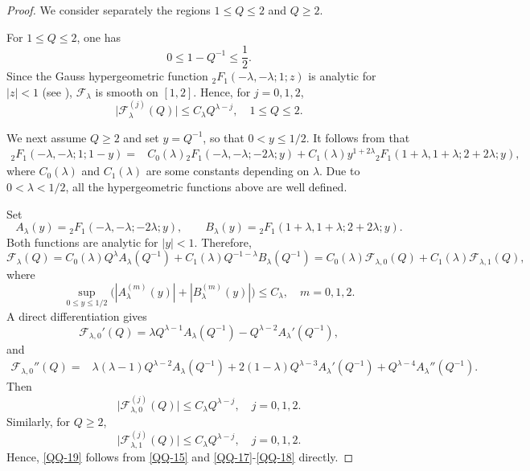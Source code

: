 \documentclass[11pt,twoside]{article}
\newcommand{\f}{\frac}
\theoremstyle{plain}
\theoremstyle{definition}
\theoremstyle{remark}
\numberwithin{equation}{section}
\begin{document}
\begin{proof}
We consider separately the regions $1\leq Q\leq2$ and $Q\geq2$.

For $1\leq Q\leq2$, one has
\[
0\leq1-Q^{-1}\leq\f12.
\]
Since the Gauss hypergeometric function ${}_2F_1(-\lambda,-\lambda;1;z)$ is analytic for $|z|<1$ (see \cite[Section~15.2]{OLBC}),
$\mathcal F_\lambda$ is smooth on $[1,2]$. Hence, for $j=0,1,2$,
\begin{equation}\label{QQ-15}
\big|
\mathcal F_\lambda^{(j)}(Q)
\big|
\leq
C_\lambda Q^{\lambda-j},
\quad 1\leq Q\leq2.
\end{equation}

We next assume $Q\geq2$ and set $y=Q^{-1}$, so that
$0<y\leq1/2$. It follows from
\cite[Section ~15.8]{OLBC} that
\[
\begin{aligned}
{}_2F_1(-\lambda,-\lambda;1;1-y)
={}&
C_{0}(\lambda)
{}_2F_1(-\lambda,-\lambda;-2\lambda;y)+
C_{1}(\lambda)
y^{1+2\lambda}
{}_2F_1(1+\lambda,1+\lambda;2+2\lambda;y),
\end{aligned}
\]
where $C_0(\lambda)$ and $C_1(\lambda)$ are some constants depending
on $\lambda$.
Due to $0<\lambda<1/2$, all the hypergeometric functions
above are well defined.

Set
\[
A_\lambda(y)={}_2F_1(-\lambda,-\lambda;-2\lambda;y),
\qquad
B_\lambda(y)={}_2F_1(1+\lambda,1+\lambda;2+2\lambda;y).
\]
Both functions are analytic for $|y|<1$. Therefore,
\begin{equation}\label{QQ-16}
\mathcal F_\lambda(Q)
=
C_{0}(\lambda)Q^\lambda A_\lambda(Q^{-1})
+
C_{1}(\lambda)Q^{-1-\lambda}B_\lambda(Q^{-1})=C_{0}(\lambda)\mathcal F_{\lambda,0}(Q)+C_{1}(\lambda)\mathcal F_{\lambda,1}(Q),
\end{equation}
where
\[
\sup_{0\leq y\leq1/2}
\big(
|A_\lambda^{(m)}(y)|
+
|B_\lambda^{(m)}(y)|
\big)
\leq C_\lambda,
\quad m=0,1,2.
\]
A direct differentiation gives
\[
\mathcal F_{\lambda,0}'(Q)
=\lambda Q^{\lambda-1}A_\lambda(Q^{-1})
-Q^{\lambda-2}A_\lambda'(Q^{-1}),
\]
and
\[
\begin{aligned}
\mathcal F_{\lambda,0}''(Q)
={}&\lambda(\lambda-1)Q^{\lambda-2}A_\lambda(Q^{-1})
+2(1-\lambda)Q^{\lambda-3}A_\lambda'(Q^{-1})+
Q^{\lambda-4}A_\lambda''(Q^{-1}).
\end{aligned}
\]
Then
\begin{equation}\label{QQ-17}
\big|
\mathcal F_{\lambda,0}^{(j)}(Q)
\big|
\leq
C_\lambda Q^{\lambda-j},
\quad j=0,1,2.
\end{equation}
Similarly, for $Q\geq2$,
\begin{equation}\label{QQ-18}
\big|
\mathcal F_{\lambda,1}^{(j)}(Q)
\big|
\leq
C_\lambda Q^{\lambda-j},
\quad j=0,1,2.
\end{equation}
Hence, \eqref{QQ-19} follows  from \eqref{QQ-15} and \eqref{QQ-17}-\eqref{QQ-18} directly.
\end{proof}
\end{document}
